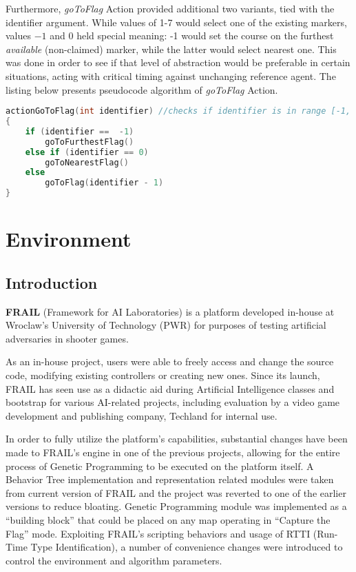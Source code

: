 Furthermore, \textit{goToFlag} Action provided additional two variants, tied with the identifier argument. While values of 1-7 would select one of the existing markers, values $-1$ and $0$ held special meaning: -1 would set the course on the furthest \textit{available} (non-claimed) marker, while the latter would select nearest one. This was done in order to see if that level of abstraction would be preferable in certain situations, acting with critical timing against unchanging reference agent. The listing below presents pseudocode algorithm of \textit{goToFlag} Action.

\begin{lstlisting}[language=C++]
actionGoToFlag(int identifier) //checks if identifier is in range [-1, 7] before
{
    if (identifier ==  -1)
        goToFurthestFlag()
    else if (identifier == 0)
        goToNearestFlag()
    else
        goToFlag(identifier - 1)
}
\end{lstlisting}
\section{Environment}
\subsection{Introduction}
\textbf{FRAIL} (Framework for AI Laboratories) is a platform developed in-house at Wroclaw's University of Technology (PWR) for purposes of testing artificial adversaries in shooter games. \cite{frailweb}

As an in-house project, users were able to freely access and change the source code, modifying existing controllers or creating new ones. Since its launch, FRAIL has seen use as a didactic aid during Artificial Intelligence classes and bootstrap for various AI-related projects, including evaluation by a video game development and publishing company, Techland for internal use. %

In order to fully utilize the platform's capabilities, substantial changes have been made to FRAIL's engine in one of the previous projects, allowing for the entire process of Genetic Programming to be executed on the platform itself. A Behavior Tree implementation and representation related modules were taken from current version of FRAIL and the project was reverted to one of the earlier versions to reduce bloating. Genetic Programming module was implemented as a ``building block'' that could be placed on any map operating in ``Capture the Flag'' mode. Exploiting FRAIL's scripting behaviors and usage of RTTI (Run-Time Type Identification), a number of convenience changes were introduced to control the environment and algorithm parameters.
